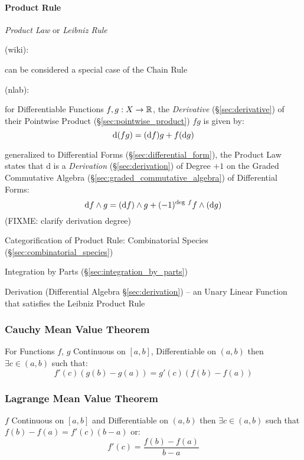 \paragraph{Product Rule}\label{sec:product_rule}\hfill

\emph{Product Law} or \emph{Leibniz Rule}

(wiki):

can be considered a special case of the Chain Rule

(nlab):

for Differentiable Functions $f, g : X \rightarrow \mathbb{R}$, the
\emph{Derivative} (\S\ref{sec:derivative}) of their Pointwise Product
(\S\ref{sec:pointwise_product}) $fg$ is given by:
\[
  \mathrm{d}(fg) = (\mathrm{d}f)g + f(\mathrm{d}g)
\]

generalized to Differential Forms (\S\ref{sec:differential_form}), the Product
Law states that $\mathrm{d}$ is a \emph{Derivation} (\S\ref{sec:derivation}) of
Degree $+1$ on the Graded Commutative Algebra
(\S\ref{sec:graded_commutative_algebra}) of Differential Forms:
\[
\mathrm{d}f \wedge g = (\mathrm{d}f) \wedge g +
  (-1)^{\mathrm{deg}\ f}f \wedge (\mathrm{d}g)
\]
(FIXME: clarify derivation degree)

Categorification of Product Rule: Combinatorial Species
(\S\ref{sec:combinatorial_species}) %

\fist Integration by Parts (\S\ref{sec:integration_by_parts})

\fist Derivation (Differential Algebra \S\ref{sec:derivation}) -- an Unary
Linear Function that satisfies the Leibniz Product Rule



\subsubsection{Cauchy Mean Value Theorem}
\label{sec:cauchy_mean_value}

For Functions $f$, $g$ Continuous on $[a,b]$, Differentiable on
$(a,b)$ then $\exists c \in (a,b)$ such that:
\[
  f'(c) (g(b) - g(a)) = g'(c) (f(b) - f(a))
\]



\subsubsection{Lagrange Mean Value Theorem}
\label{sec:lagrange_mean_value}

$f$ Continuous on $[a,b]$ and Differentiable on $(a,b)$ then $\exists
c \in (a,b)$ such that $f(b) - f(a) = f'(c)(b-a)$ or:
\[
  f'(c) = \frac{f(b) - f(a)}{b - a}
\]



